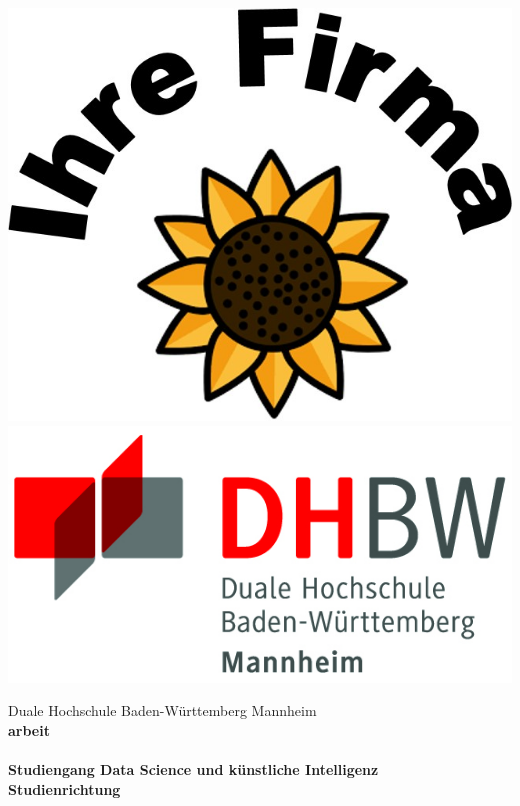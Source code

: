 \begin{titlepage}
\begin{minipage}{\textwidth}
		\vspace{-2cm}
		\noindent \includegraphics[scale=0.25]{60-figures/img/logo/firmenlogo.jpg} \hfill \includegraphics{60-figures/img/logo/logo_dhbw.jpg}
\end{minipage}
\vspace{1em}
\begin{center}
	{\textsf{\large Duale Hochschule Baden-W\"urttemberg Mannheim}}\\[4em]
	{\textsf{\textbf{\large{\DieArtDerArbeit}arbeit}}}\\[6mm]
	{\textsf{\textbf{\Large{}\DerTitelDerArbeit}}} \\[1.5cm]
	{\textsf{\textbf{\large{}Studiengang Data Science und künstliche Intelligenz}}\\[6mm]}
	{\textsf{\textbf{Studienrichtung \DieStudienrichtung}}}
        \vspace{20em}
	

\end{center}
\end{titlepage}

